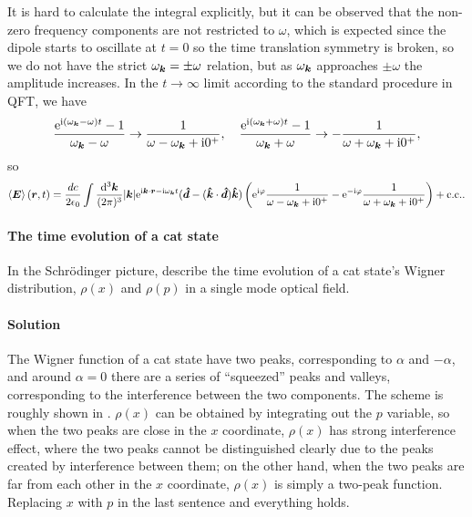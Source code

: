 \documentclass[hyperref, a4paper]{article}
\newcommand*{\ii}{\mathrm{i}}
\newcommand*{\ee}{\mathrm{e}}
\begin{document}
It is hard to calculate the integral explicitly, but it can be observed that the non-zero frequency components are not restricted to $\omega$, which is expected since the dipole starts to oscillate at $t=0$ so the time translation symmetry is broken, so we do not have the strict $\omega_{\vb*{k}} = \pm \omega$ relation, but as $\omega_{\vb*{k}}$ approaches $\pm \omega$ the amplitude increases.
In the $t \to \infty$ limit according to the standard procedure in QFT, we have 
\[
    \frac{\ee^{\ii (\omega_{\vb*{k}} - \omega) t} - 1}{\omega_{\vb*{k}} - \omega}  \to \frac{1}{\omega - \omega_{\vb*{k}} + \ii 0^+}, \quad \frac{\ee^{\ii (\omega_{\vb*{k}} + \omega) t} - 1}{\omega_{\vb*{k}} + \omega} \to - \frac{1}{\omega + \omega_{\vb*{k}} + \ii 0^+},
\]
so 
\begin{equation}
    \expval{\vb*{E}}(\vb*{r}, t) = \frac{d c}{2 \epsilon_0 } \int \frac{\dd[3]{\vb*{k}}}{(2\pi)^3} \abs{\vb*{k}} \ee^{\ii \vb*{k} \cdot \vb*{r} - \ii \omega_{\vb*{k}} t} (\vu*{d} - (\vu*{k} \cdot \vu*{d}) \vu*{k}) \left( \ee^{\ii \varphi} \frac{1}{\omega - \omega_{\vb*{k}} + \ii 0^+} - \ee^{- \ii \varphi} \frac{1}{\omega + \omega_{\vb*{k}} + \ii 0^+} \right) + \text{c.c.}.
\end{equation}

\paragraph{The time evolution of a cat state} In the Schrödinger picture, describe the time evolution of a cat state's Wigner distribution, $\rho(x)$ and $\rho(p)$ in a single mode optical field.

\paragraph{Solution} The Wigner function of a cat state have two peaks, corresponding to $\alpha$ and $-\alpha$, and around $\alpha = 0$ there are a series of ``squeezed'' peaks and valleys, corresponding to the interference between the two components.
The scheme is roughly shown in .
$\rho(x)$ can be obtained by integrating out the $p$ variable, so when the two peaks are close in the $x$ coordinate, $\rho(x)$ has strong interference effect, where the two peaks cannot be distinguished clearly due to the peaks created by interference between them; on the other hand, when the two peaks are far from each other in the $x$ coordinate, $\rho(x)$ is simply a two-peak function.
Replacing $x$ with $p$ in the last sentence and everything holds.
\end{document}
